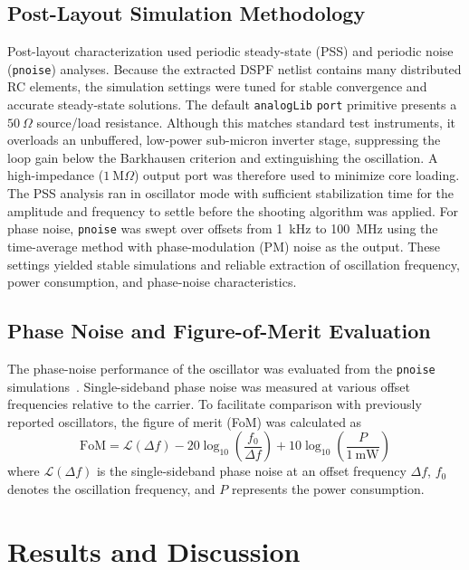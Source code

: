 \documentclass[conference,a4paper]{IEEEtran} %
\begin{document}
\subsection{Post-Layout Simulation Methodology}
Post-layout characterization used periodic steady-state (PSS) and periodic noise
(\texttt{pnoise}) analyses. Because the extracted DSPF netlist contains many
distributed RC elements, the simulation settings were tuned for stable
convergence and accurate steady-state solutions. The default \texttt{analogLib}
\texttt{port} primitive presents a $50~\Omega$ source/load resistance. Although
this matches standard test instruments, it overloads an unbuffered, low-power
sub-micron inverter stage, suppressing the loop gain below the Barkhausen
criterion and extinguishing the oscillation. A high-impedance
($1~\text{M}\Omega$) output port was therefore used to minimize core loading.
The PSS analysis ran in oscillator mode with sufficient stabilization time for
the amplitude and frequency to settle before the shooting algorithm was applied.
For phase noise,
\texttt{pnoise} was swept over offsets from 1~kHz to 100~MHz using the
time-average method with phase-modulation (PM) noise as the output. These
settings yielded stable simulations and reliable extraction of oscillation
frequency, power consumption, and phase-noise characteristics.

\subsection{Phase Noise and Figure-of-Merit Evaluation}
The phase-noise performance of the oscillator was evaluated from the
\texttt{pnoise} simulations~\cite{hajimiri_theory, razavi_phase}. Single-sideband
phase noise was measured at various offset frequencies relative to the carrier.
To facilitate comparison with previously reported oscillators, the figure of
merit (FoM) was calculated as~\cite{lee_tutorial}
\begin{equation}\label{eq:fom}
\text{FoM} = \mathcal{L}(\Delta f) - 20\log_{10}\!\left(\frac{f_0}{\Delta f}\right)
+ 10\log_{10}\!\left(\frac{P}{1~\text{mW}}\right)
\end{equation}
where $\mathcal{L}(\Delta f)$ is the single-sideband phase noise at an offset
frequency $\Delta f$, $f_0$ denotes the oscillation frequency, and $P$ represents
the power consumption.

\section{Results and Discussion}
\end{document}
